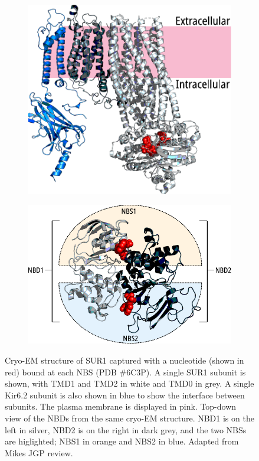 \begin{figure}[h]
	\centering
	\begin{subfigure}[t]{0.4\textwidth}
		\caption{}\label{ch1fig:sur_struct}
		\centering
		\includegraphics[width=\textwidth]{sur_structure.pdf}
	\end{subfigure}
	\hfill
	\begin{subfigure}[t]{0.5\textwidth}
		\caption{}\label{ch1fig:nbd_struct}
		\centering
		\includegraphics[width=\textwidth]{nbd_structure.pdf}
	\end{subfigure}
	\caption[Structure of SUR1]{
		 Cryo-EM structure of SUR1 captured with a nucleotide (shown in red) bound at each NBS (PDB \#6C3P).
		A single SUR1 subunit is shown, with TMD1 and TMD2 in white and TMD0 in grey.
		A single Kir6.2 subunit is also shown in blue to show the interface between subunits.
		The plasma membrane is displayed in pink.
		 Top-down view of the NBDs from the same cryo-EM structure.
		NBD1 is on the left in silver, NBD2 is on the right in dark grey, and the two NBSs are higlighted; NBS1 in orange and NBS2 in blue.
		Adapted from Mikes JGP review.
	}
\end{figure}

